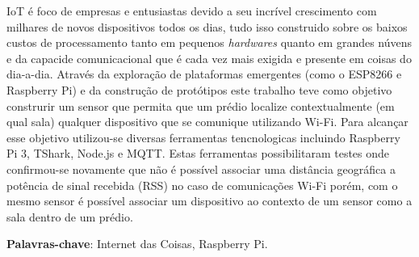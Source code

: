 \setlength{\absparsep}{18pt} %
\begin{resumo}

	IoT é foco de empresas e entusiastas devido a seu incrível crescimento com
	milhares de novos dispositivos todos os dias, tudo isso construido sobre os
	baixos custos de processamento tanto em pequenos \emph{hardwares} quanto em
	grandes núvens e da capacide comunicacional que é cada vez mais exigida e
	presente em coisas do dia-a-dia.
	Através da exploração de plataformas emergentes (como o ESP8266 e Raspberry
	Pi) e da construção de protótipos este trabalho teve como objetivo
	construrir um sensor que permita que um prédio localize contextualmente (em
	qual sala) qualquer dispositivo que se comunique utilizando Wi-Fi. Para
	alcançar esse objetivo utilizou-se diversas ferramentas tencnologicas
	incluindo Raspberry Pi 3, TShark, Node.js e MQTT.
	Estas ferramentas possibilitaram testes onde confirmou-se novamente que não é
	possível associar uma distância geográfica a potência de sinal recebida
	(RSS) no caso de comunicações Wi-Fi porém, com o mesmo sensor é possível
	associar um dispositivo ao contexto de um sensor como a sala dentro de um
	prédio.

	\textbf{Palavras-chave}: Internet das Coisas, Raspberry Pi.
\end{resumo}
